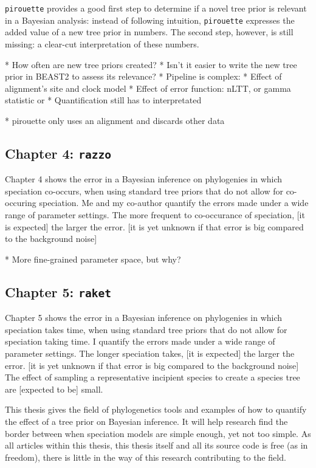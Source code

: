 \verb;pirouette; provides a good first step to determine 
if a novel tree prior is relevant in a Bayesian analysis:
instead of following intuition, \verb;pirouette; expresses 
the added value of a new tree prior in numbers. The second step,
however, is still missing: a clear-cut interpretation of these numbers.

 * How often are new tree priors created?
 * Isn't it easier to write the new tree prior in BEAST2 to assess its
   relevance?
 * Pipeline is complex:
   * Effect of alignment's site and clock model
   * Effect of error function: nLTT, or gamma statistic or 
 * Quantification still has to interpretated

 * pirouette only uses an alignment and discards other data

\subsection{Chapter 4: \texttt{razzo}}

Chapter 4 shows the error in a Bayesian inference on
phylogenies in which speciation co-occurs, when using standard
tree priors that do not allow for co-occuring speciation.
Me and my co-author quantify the errors made under a wide range
of parameter settings. The more frequent to co-occurance of speciation,
[it is expected] the larger the error. 
[it is yet unknown if that error is big compared to the background noise]

 * More fine-grained parameter space, but why?

\subsection{Chapter 5: \texttt{raket}}

Chapter 5 shows the error in a Bayesian inference on
phylogenies in which speciation takes time, when using standard
tree priors that do not allow for speciation taking time.
I quantify the errors made under a wide range
of parameter settings. The longer speciation takes, [it is expected] the larger the error. 
[it is yet unknown if that error is big compared to the background noise]
The effect of sampling a representative incipient species to create
a species tree are [expected to be] small.

This thesis gives the field of phylogenetics tools and examples of
how to quantify the effect of a tree prior on Bayesian inference.
It will help research find the border between when speciation models are
simple enough, yet not too simple. As all articles within this thesis,
this thesis itself and all its source code is free (as in freedom),
there is little in the way of this research contributing to the field. 

